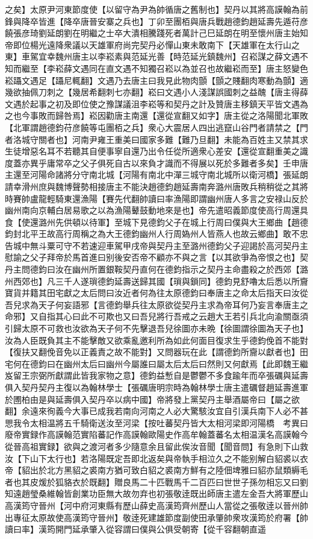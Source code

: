 之矣】太原尹河東節度使【以留守為尹為帥循唐之舊制也】契丹以其將高謨翰為前鋒與降卒皆進【降卒唐晉安寨之兵也】丁卯至團栢與唐兵戰趙德鈞趙延壽先遁苻彦饒張彦琦劉延朗劉在明繼之士卒大潰相騰踐死者萬計己巳延朗在明至懷州唐主始知帝即位楊光遠降衆議以天雄軍府尚完契丹必憚山東未敢南下【天雄軍在太行山之東】車駕宜幸魏州唐主以李崧素與范延光善【時范延光鎮魏州】召崧謀之薛文遇不知而繼至【李崧薛文遇同在直文遇不知獨召崧以為並召也故繼崧而至】唐主怒變色崧躡文遇足【躡尼輒翻】文遇乃去唐主曰我見此物肉顫【顫之賤翻肉寒動為顫】適幾欲抽佩刀刺之【幾居希翻刺七亦翻】崧曰文遇小人淺謀誤國刺之益醜【唐主得薛文遇於起事之初及即位使之豫謀議沮李崧等和契丹之計及贊唐主移鎮天平皆文遇為之也今事敗而歸咎焉】崧因勸唐主南還【還從宣翻又如字】唐主從之洛陽聞北軍敗【北軍謂趙德鈞苻彦饒等屯團栢之兵】衆心大震居人四出逃竄山谷門者請禁之【門者洛城守關者也】河南尹雍王重美曰國家多難【難乃旦翻】未能為百姓主又禁其求生徒增惡名耳不若聽其自便事寧自還乃出令任從所適衆心差安【還從宣翻重美之識度蓋亦異乎庸常卒之父子俱死自古以來負才識而不得展以死於多難者多矣】壬申唐主還至河陽命諸將分守南北城【河陽有南北中潬三城守南北城所以衛河橋】張延朗請幸滑州庶與魏博聲勢相接唐主不能決趙德鈞趙延壽南奔潞州唐敗兵稍稍從之其將時賽帥盧龍輕騎東還漁陽【賽先代翻帥讀曰率漁陽即謂幽州唐人多言之安禄山反於幽州南向京輔白居易歌之以為漁陽鼙鼓動地來是也】帝先遣昭義節度使高行周還具食【使還潞州先供頓以待軍】至城下見德鈞父子在城上行周曰僕與大王鄉曲【趙德鈞封北平王故高行周稱之為大王德鈞幽州人行周媯州人皆燕人也故云鄉曲】敢不忠告城中無斗粟可守不若速迎車駕甲戌帝與契丹主至潞州德鈞父子迎謁於高河契丹主慰諭之父子拜帝於馬首進曰别後安否帝不顧亦不與之言【以其欲爭為帝恨之也】契丹主問德鈞曰汝在幽州所置銀鞍契丹直何在德鈞指示之契丹主命盡殺之於西郊【潞州西郊也】凡三千人遂瑣德鈞延壽送歸其國【瑣與鎖同】德鈞見舒嚕太后悉以所齎寶貨并籍其田宅獻之太后問曰汝近者何為往太原德鈞曰奉唐主之命太后指天曰汝從吾兒求為天子何妄語邪【言德鈞舉兵往太原欲從契丹主求為帝耳何乃妄言奉唐主之命邪】又自指其心曰此不可欺也又曰吾兒將行吾戒之云趙大王若引兵北向渝關亟須引歸太原不可救也汝欲為天子何不先擊退吾兒徐圖亦未晩【徐圖謂徐圖為天子也】汝為人臣既負其主不能擊敵又欲乘亂邀利所為如此何面目復求生乎德鈞俛首不能對【復扶又翻俛音免以正義責之故不能對】又問器玩在此【謂德鈞所齎以獻者也】田宅何在德鈞曰在幽州太后曰幽州今屬誰曰屬太后太后曰然則又何獻焉【此即魏王繼岌留王宗弼所獻謂此皆我家物之意】德鈞益慙自是鬱鬱不多食踰年而卒張礪與延壽俱入契丹契丹主復以為翰林學士【張礪唐明宗時為翰林學士唐主遣礪督趙延壽進軍於圑柏由是與延壽俱入契丹卒以病中國】帝將發上黨契丹主舉酒屬帝曰【屬之欲翻】余遠來徇義今大事已成我若南向河南之人必大驚駭汝宜自引漢兵南下人必不甚愳我令太相温將五千騎衛送汝至河梁【按吐蕃契丹皆大太相河梁即河陽橋　考異曰廢帝實録作高謨翰范實陷蕃記作高謨翰歐陽史作高牟翰蓋蕃名太相温漢名高謨翰今從晉高祖實録】欲與之渡河者多少隨意余且留此俟汝音聞【聞音問】有急則下山救汝【下山下太行也】若洛陽既定吾即北返矣與帝執手相泣久之不能别解白貂裘以衣帝【貂出於北方黑貂之裘南方猶可致白貂之裘南方鮮有之陸佃埤雅曰貂亦鼠類縟毛者也其皮煖於狐貉衣於既翻】贈良馬二十匹戰馬千二百匹曰世世子孫勿相忘又曰劉知遠趙瑩桑維翰皆創業功臣無大故勿弃也初張敬逹既出師唐主遣左金吾大將軍歷山高漢筠守晉州【河中府河東縣有歷山薛史高漢筠齊州歷山人當從之張敬逹以晉州帥出專征太原故使高漢筠守晉州】敬逹死建雄節度副使田承肇帥衆攻漢筠於府署【帥讀曰率】漢筠開門延承肇入從容謂曰僕與公俱受朝寄【從千容翻朝直遥